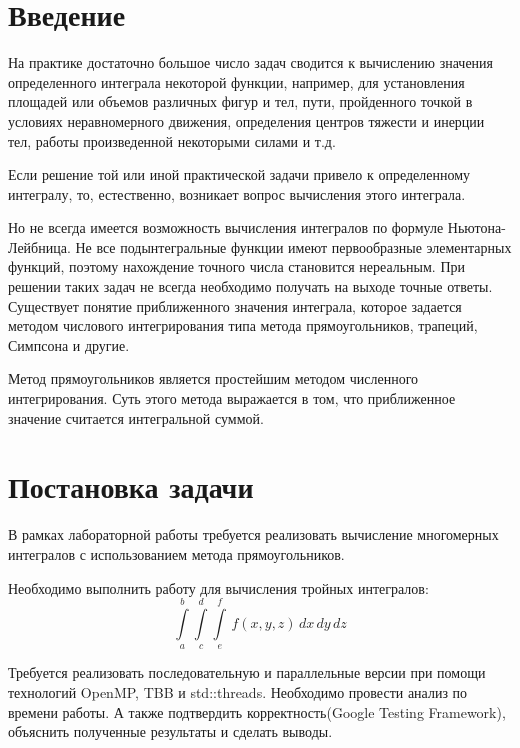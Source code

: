 \documentclass{report}
\begin{document}
\setcounter{page}{2}

\tableofcontents
\newpage

\section*{Введение}
На практике достаточно большое число задач сводится к вычислению значения
определенного интеграла некоторой функции, например, для установления площадей или объемов различных фигур и тел, пути, пройденного точкой в условиях неравномерного движения, определения центров тяжести и инерции тел, работы произведенной некоторыми силами и т.д.
\par Если решение той или иной практической задачи привело к определенному интегралу, то, естественно, возникает вопрос вычисления этого интеграла. 
\par Но не всегда имеется возможность вычисления интегралов по формуле Ньютона-Лейбница. Не все подынтегральные функции имеют первообразные элементарных функций, поэтому нахождение точного числа становится нереальным. При решении таких задач не всегда необходимо получать на выходе точные ответы. Существует понятие приближенного значения интеграла, которое задается методом числового интегрирования типа метода прямоугольников, трапеций, Симпсона и другие.
\par Метод прямоугольников является простейшим методом численного интегрирования. Суть этого метода выражается в том, что приближенное значение считается интегральной суммой.

\newpage

\section*{Постановка задачи}
В рамках лабораторной работы требуется реализовать вычисление многомерных интегралов с использованием метода прямоугольников. 
\par Необходимо выполнить работу для вычисления тройных интегралов:
$$\int\limits_a^b 
\int\limits_c^d 
\int\limits_e^f \,f(x,y,z)\,dx\,dy\,dz
$$
\par Требуется реализовать последовательную и параллельные версии при помощи технологий OpenMP, TBB и std::threads. Необходимо провести анализ по времени работы. А также подтвердить корректность(Google Testing Framework), объяснить полученные результаты и сделать выводы. 
\newpage
\end{document}
